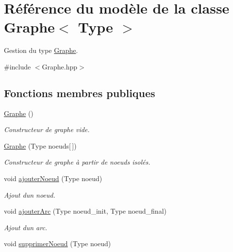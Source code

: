 \hypertarget{classGraphe}{}\section{Référence du modèle de la classe Graphe$<$ Type $>$}
\label{classGraphe}


Gestion du type \hyperlink{classGraphe}{Graphe}.  




{\ttfamily \#include $<$Graphe.\+hpp$>$}

\subsection*{Fonctions membres publiques}
\begin{DoxyCompactItemize}
\item 
\mbox{\label{classGraphe_ac6269bd27d5bd9386348e34879619d2f}} 
\hyperlink{classGraphe_ac6269bd27d5bd9386348e34879619d2f}{Graphe} ()
\begin{DoxyCompactList}\small\item\em Constructeur de graphe vide. \end{DoxyCompactList}\item 
\mbox{\label{classGraphe_a4769b44ffb23da74a1b413857966c157}} 
\hyperlink{classGraphe_a4769b44ffb23da74a1b413857966c157}{Graphe} (Type noeuds\mbox{[}$\,$\mbox{]})
\begin{DoxyCompactList}\small\item\em Constructeur de graphe à partir de noeuds isolés. \end{DoxyCompactList}\item 
void \hyperlink{classGraphe_a555829daa877e49cdb4e9555e559650c}{ajouter\+Noeud} (Type noeud)
\begin{DoxyCompactList}\small\item\em Ajout d\textquotesingle{}un noeud. \end{DoxyCompactList}\item 
void \hyperlink{classGraphe_a690a652df5be597b9045d2036bad11ed}{ajouter\+Arc} (Type noeud\+\_\+init, Type noeud\+\_\+final)
\begin{DoxyCompactList}\small\item\em Ajout d\textquotesingle{}un arc. \end{DoxyCompactList}\item 
void \hyperlink{classGraphe_a5887c7cd72bcf4b5f8c169a22b5180f1}{supprimer\+Noeud} (Type noeud)

\end{DoxyCompactItemize}

